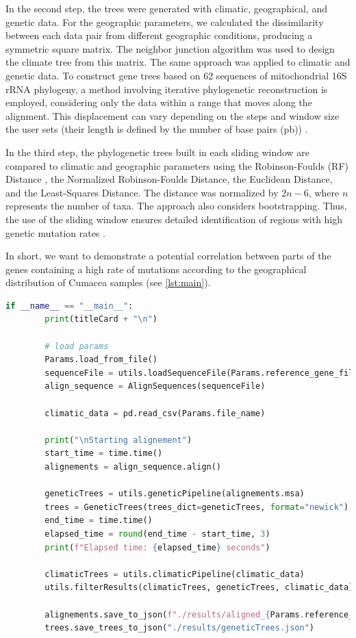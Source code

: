     In the second step, the trees were generated with climatic, geographical, and genetic data. For the geographic parameters, we calculated the dissimilarity between each data pair from different geographic conditions, producing a symmetric square matrix. The neighbor junction algorithm was used to design the climate tree from this matrix. The same approach was applied to climatic and genetic data. To construct gene trees based on 62 sequences of mitochondrial 16S rRNA phylogeny, a method involving iterative phylogenetic reconstruction is employed, considering only the data within a range that moves along the alignment. This displacement can vary depending on the steps and window size the user sets (their length is defined by the number of base pairs (pb)) \citep{koshkarov_phylogeography_2022}.

    In the third step, the phylogenetic trees built in each sliding window are compared to climatic and geographic parameters using the Robinson-Foulds (RF) Distance \citep{robinson_comparison_1981,koshkarov_phylogeography_2022}, the Normalized Robinson-Foulds Distance, the Euclidean Distance, and the Least-Squares Distance. The distance was normalized by $2n-6$, where $n$ represents the number of taxa. The approach also considers bootstrapping. Thus, the use of the sliding window ensures detailed identification of regions with high genetic mutation rates \citep{koshkarov_phylogeography_2022}.

In short, we want to demonstrate a potential correlation between parts of the genes containing a high rate of mutations according to the geographical distribution of Cumacea samples (see \autoref{lst:main}).

\begin{lstlisting}[label=lst:main,language=Python,caption=aPhyloGeo’s main function]
    if __name__ == "__main__":
        print(titleCard + "\n")

        # load params 
        Params.load_from_file()
        sequenceFile = utils.loadSequenceFile(Params.reference_gene_filepath)
        align_sequence = AlignSequences(sequenceFile)

        climatic_data = pd.read_csv(Params.file_name)

        print("\nStarting alignement")
        start_time = time.time()
        alignements = align_sequence.align()

        geneticTrees = utils.geneticPipeline(alignements.msa)
        trees = GeneticTrees(trees_dict=geneticTrees, format="newick")
        end_time = time.time()
        elapsed_time = round(end_time - start_time, 3)
        print(f"Elapsed time: {elapsed_time} seconds")

        climaticTrees = utils.climaticPipeline(climatic_data)
        utils.filterResults(climaticTrees, geneticTrees, climatic_data)

        alignements.save_to_json(f"./results/aligned_{Params.reference_gene_file}.json")
        trees.save_trees_to_json("./results/geneticTrees.json")
\end{lstlisting}

